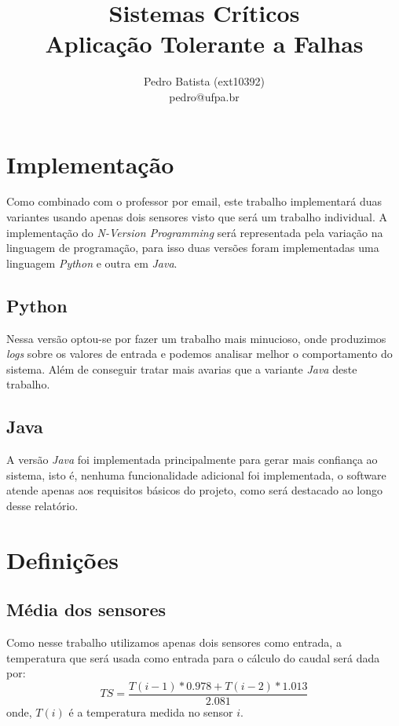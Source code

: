 \documentclass[a4paper,12pt]{article}
\title{Sistemas Críticos\\[10pt]
\Large{Aplicação Tolerante a Falhas}}
\author{Pedro Batista (ext10392)\\
pedro@ufpa.br}
\begin{document}
\maketitle

\section{Implementação}

Como combinado com o professor por email, este trabalho implementará duas
variantes usando apenas dois sensores visto que será um trabalho individual. A
implementação do \textit{N-Version Programming} será representada pela variação
na linguagem de programação, para isso duas versões foram implementadas uma
linguagem \textit{Python} e outra em \textit{Java}.

\subsection{Python}\label{python}
Nessa versão optou-se por fazer um trabalho mais minucioso, onde produzimos
\textit{logs} sobre os valores de entrada e podemos analisar melhor o
comportamento do sistema. Além de conseguir tratar mais avarias que a variante
\textit{Java} deste trabalho.

\subsection{Java}\label{java}
A versão \textit{Java} foi implementada principalmente para gerar mais confiança
ao sistema, isto é, nenhuma funcionalidade adicional foi implementada, o
software atende apenas aos requisitos básicos do projeto, como será destacado ao
longo desse relatório.

\section{Definições}

\subsection{Média dos sensores}
Como nesse trabalho utilizamos apenas dois sensores como entrada, a temperatura
que será usada como entrada para o cálculo do caudal será dada por:
\begin{equation}
TS=\frac{T(i-1)*0.978+T(i-2)*1.013}{2.081}
\label{eq:media_temp}
\end{equation}
onde,
$T(i)$ é a temperatura medida no sensor $i$.
\end{document}
